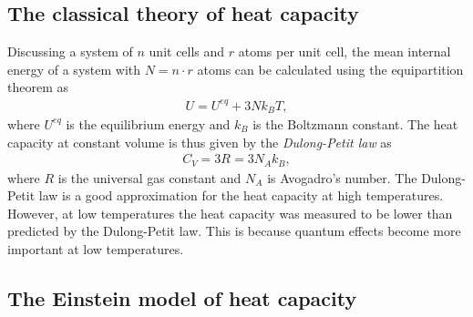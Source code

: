 \subsection{The classical theory of heat capacity}
\label{sec:classical}

Discussing a system of $n$ unit cells and $r$ atoms per unit cell, the mean internal energy of a system with $N=n\cdot r$ atoms can be calculated using the equipartition theorem as
\begin{align}
    U = U^{eq} + 3Nk_B T,
    \label{eq:U}
\end{align}
where $U^{eq}$ is the equilibrium energy and $k_B$ is the Boltzmann constant.
The heat capacity at constant volume is thus given by the \textit{Dulong-Petit law} as
\begin{align}
    C_V = 3R = 3N_A k_B,
    \label{eq:dulong-petit}
\end{align}
where $R$ is the universal gas constant and $N_A$ is Avogadro's number.\newline
The Dulong-Petit law is a good approximation for the heat capacity at high temperatures.
However, at low temperatures the heat capacity was measured to be lower than predicted by the Dulong-Petit law.
This is because quantum effects become more important at low temperatures.

\subsection{The Einstein model of heat capacity}
\label{sec:einstein}

